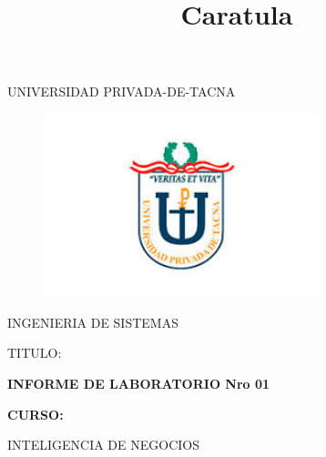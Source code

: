 \documentclass[12pt,letterpaper]{article}
\begin{document}
%


\title{Caratula}

\begin{titlepage}
\begin{center}
\large{UNIVERSIDAD PRIVADA-DE-TACNA}\\
\vspace*{-0.025in}
\begin{figure}[htb]
\begin{center}
\includegraphics[width=8cm]{./Imagenes/logo}
\end{center}
\end{figure}
\vspace*{0.15in}
INGENIERIA DE SISTEMAS  \\

\vspace*{0.5in}
\begin{large}
TITULO:\\
\end{large}

\vspace*{0.1in}
\begin{Large}
\textbf{INFORME DE LABORATORIO Nro 01} \\
\end{Large}

\vspace*{0.3in}
\begin{Large}
\textbf{CURSO:} \\
\end{Large}

\vspace*{0.1in}
\begin{large}
INTELIGENCIA DE NEGOCIOS\\
\end{large}


\end{center}
\end{titlepage}
\end{document}
